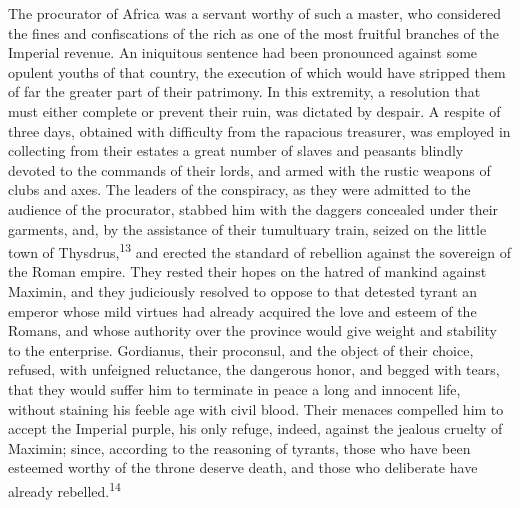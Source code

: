 The procurator of Africa was a servant worthy of such a master,
who considered the fines and confiscations of the rich as one of
the most fruitful branches of the Imperial revenue. An iniquitous
sentence had been pronounced against some opulent youths of that
country, the execution of which would have stripped them of far
the greater part of their patrimony. In this extremity, a
resolution that must either complete or prevent their ruin, was
dictated by despair. A respite of three days, obtained with
difficulty from the rapacious treasurer, was employed in
collecting from their estates a great number of slaves and
peasants blindly devoted to the commands of their lords, and
armed with the rustic weapons of clubs and axes. The leaders of
the conspiracy, as they were admitted to the audience of the
procurator, stabbed him with the daggers concealed under their
garments, and, by the assistance of their tumultuary train,
seized on the little town of Thysdrus,\textsuperscript{13} and erected the
standard of rebellion against the sovereign of the Roman empire.
They rested their hopes on the hatred of mankind against Maximin,
and they judiciously resolved to oppose to that detested tyrant
an emperor whose mild virtues had already acquired the love and
esteem of the Romans, and whose authority over the province would
give weight and stability to the enterprise. Gordianus, their
proconsul, and the object of their choice, refused, with
unfeigned reluctance, the dangerous honor, and begged with tears,
that they would suffer him to terminate in peace a long and
innocent life, without staining his feeble age with civil blood.
Their menaces compelled him to accept the Imperial purple, his
only refuge, indeed, against the jealous cruelty of Maximin;
since, according to the reasoning of tyrants, those who have been
esteemed worthy of the throne deserve death, and those who
deliberate have already rebelled.\textsuperscript{14}



